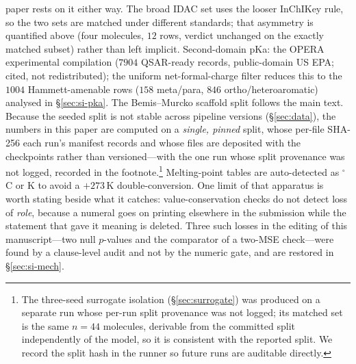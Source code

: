 paper rests on it either way. The broad IDAC set uses the looser InChIKey rule, so the two sets are matched under
different standards; that asymmetry is quantified above (four molecules, $12$ rows, verdict unchanged
on the exactly matched subset) rather than left implicit. Second-domain pKa: the OPERA experimental compilation
\cite{mansouri2019opera} ($7904$ QSAR-ready records, public-domain US EPA;
cited, not redistributed); the uniform net-formal-charge filter reduces this to the $1004$
Hammett-amenable rows ($158$ meta/para, $846$ ortho/heteroaromatic) analysed in \S\ref{sec:si-pka}. The Bemis--Murcko scaffold split follows the main text. Because the seeded
split is not stable across pipeline versions (\S\ref{sec:data}), the numbers in this paper are
computed on a \emph{single, pinned} split, whose per-file SHA-256 each run's manifest records and
whose files are deposited with the checkpoints rather than versioned---with the one run whose split
provenance was not logged, recorded in the
footnote.\footnote{The three-seed surrogate isolation (\S\ref{sec:surrogate}) was produced on a
separate run whose per-run split provenance was not logged; its matched set is the same $n{=}44$
molecules, derivable from the committed split independently of the model, so it is consistent with the
reported split. We record the split hash in the runner so future runs are auditable directly.}
Melting-point tables are auto-detected as $^\circ$C or K to avoid a $+273$\,K double-conversion.
One limit of that apparatus is worth stating beside what it catches: value-conservation checks do
not detect loss of \emph{role}, because a numeral goes on printing elsewhere in the submission
while the statement that gave it meaning is deleted. Three such losses in the editing of this
manuscript---two null $p$-values and the comparator of a two-MSE check---were found by a
clause-level audit and not by the numeric gate, and are restored in \S\ref{sec:si-mech}.
